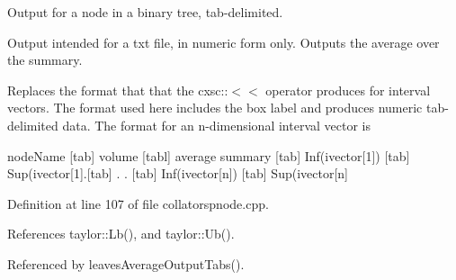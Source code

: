 \-Output for a node in a binary tree, tab-\/delimited. 

\-Output intended for a txt file, in numeric form only. \-Outputs the average over the summary.

\-Replaces the format that that the cxsc\-:\-:$<$$<$ operator produces for interval vectors. \-The format used here includes the box label and produces numeric tab-\/delimited data. \-The format for an n-\/dimensional interval vector is

node\-Name \mbox{[}tab\mbox{]} volume \mbox{[}tabl\mbox{]} average summary \mbox{[}tab\mbox{]} \-Inf(ivector\mbox{[}1\mbox{]}) \mbox{[}tab\mbox{]} \-Sup(ivector\mbox{[}1\mbox{]}.\mbox{[}tab\mbox{]} . . \mbox{[}tab\mbox{]} \-Inf(ivector\mbox{[}n\mbox{]}) \mbox{[}tab\mbox{]} \-Sup(ivector\mbox{[}n\mbox{]} 

\-Definition at line 107 of file collatorspnode.\-cpp.



\-References taylor\-::\-Lb(), and taylor\-::\-Ub().



\-Referenced by leaves\-Average\-Output\-Tabs().


